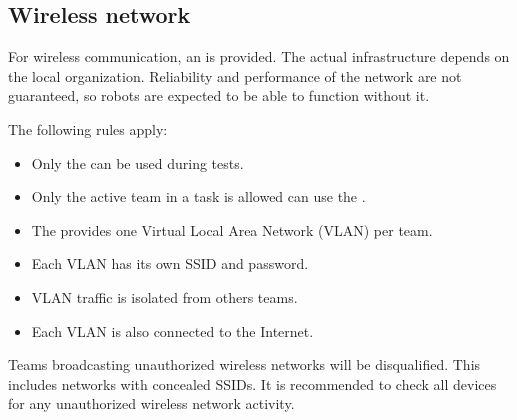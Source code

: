 \subsection{Wireless network}\label{rule:scenario_wifi}

For wireless communication, an \ArenaNetwork{} is provided.
The actual infrastructure depends on the local organization.
Reliability and performance of the network are not guaranteed, so robots are expected to be able to function without it.

The following rules apply:
\begin{itemize}
	\item Only the \ArenaNetwork{} can be used during tests.
	\item Only the active team in a task is allowed can use the \ArenaNetwork{}.
	\item The \ArenaNetwork{} provides one Virtual Local Area Network (VLAN) per team.
	\item Each VLAN has its own SSID and password.
	\item VLAN traffic is isolated from others teams.
	\item Each VLAN is also connected to the Internet.
\end{itemize}

Teams broadcasting unauthorized wireless networks will be disqualified.
This includes networks with concealed SSIDs.
It is recommended to check all devices for any unauthorized wireless network activity.


